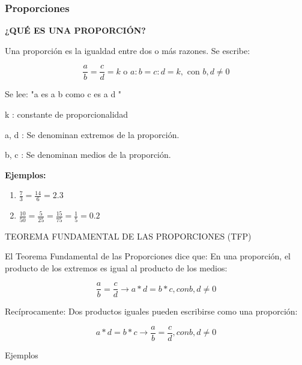 \begin{frame}
    \frametitle{Proporciones}

\textbf{¿QUÉ ES UNA PROPORCIÓN?}

\hfill

Una proporción es la igualdad entre dos o más
razones. Se escribe:

$$
\frac{a}{b} = \frac{c}{d}=k \text{ o } a:b = c:d = k, \text{ con } b,d \neq 0
$$

Se lee: {\color{red} "a es a b como c es a d "}

{\color{red} k} : constante de proporcionalidad

{\color{red} a, d} : Se denominan extremos de la proporción.

{\color{red} b, c} : Se denominan medios de la proporción.

\hfill

\textbf{Ejemplos:}

\begin{enumerate}
\item $\frac{7}{3} = \frac{14}{6}= 2.3$
\item $\frac{10}{50} = \frac{5}{25} = \frac{15}{75} = \frac{1}{5} = 0.2 $
\end{enumerate}
\end{frame}

\begin{frame}
TEOREMA FUNDAMENTAL DE LAS PROPORCIONES (TFP)

El Teorema Fundamental de las Proporciones
dice que: En una proporción, el producto de los
extremos es igual al producto de los medios:

$$
\frac{a}{b} = \frac{c}{d} \to a*d = b*c, con b,d \neq 0
$$

Recíprocamente: Dos productos iguales pueden
escribirse como una proporción:

$$
a*d = b*c \to \frac{a}{b} = \frac{c}{d}, con b,d \neq 0
$$


\hfill

Ejemplos



\end{frame}


